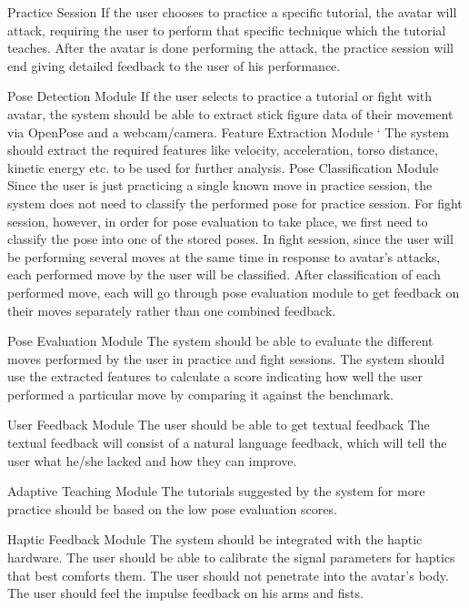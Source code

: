 \begin{outline}
 \1 Practice Session
   \2 If the user chooses to practice a specific tutorial, the avatar will attack, requiring the user to perform that specific technique which the tutorial teaches.  After the avatar is done performing the attack, the practice session will end giving detailed feedback to the user of his performance. 
 
 \1 Pose Detection Module
   \2 If the user selects to practice a tutorial or fight with avatar, the system should be able to extract stick figure data of their movement via OpenPose and a webcam/camera.
 \1 Feature Extraction Module
 `\2 The system should extract the required features like velocity, acceleration, torso distance, kinetic energy etc. to be used for further analysis.
 \1 Pose Classification Module
  \2 Since the user is just practicing a single known move in practice session, the system does not need to classify the performed pose for practice session. For fight session, however, in order for pose evaluation to take place, we first need to classify the pose into one of the stored poses.
  \2 In fight session, since the user will be performing several moves at the same time in response to avatar’s attacks, each performed move by the user will be classified. After classification of each performed move, each will go through pose evaluation module to get feedback on their moves separately rather than one combined feedback. 
  
 \1 Pose Evaluation Module
  \2 The system should be able to evaluate the different moves performed by the user in practice and fight sessions.
    \3 The system should use the extracted features to calculate a score indicating how well the user performed a particular move by comparing it against the benchmark.

 \1 User Feedback Module
  \2 The user should be able to get textual feedback 
   \3 The textual feedback will consist of a natural language feedback, which will tell the user what he/she lacked and how they can improve. 

 \1 Adaptive Teaching Module
  \2 The tutorials suggested by the system for more practice should be based on the low pose evaluation scores. 

 \1 Haptic Feedback Module
  \2 The system should be integrated with the haptic hardware.
  \2 The user should be able to calibrate the signal parameters for haptics that best comforts them.
  \2 The user should not penetrate into the avatar’s body.
  \2 The user should feel the impulse feedback on his arms and fists. 
\end{outline}

